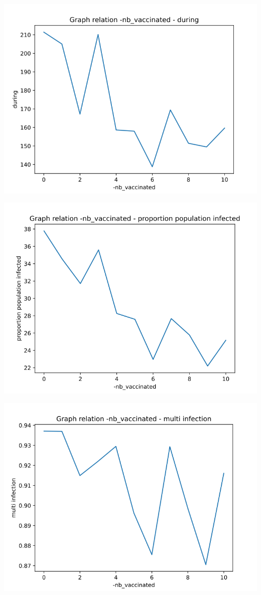 \documentclass[a4paper, 11pt]{article}
\begin{document}
				
				\includegraphics[scale=0.45]{attachements/nb_vaccinated_during.png}
				
				\includegraphics[scale=0.45]{attachements/nb_vaccinated_proportion.png}
				
				\includegraphics[scale=0.45]{attachements/nb_vaccinated_multi_infection.png}
				
\end{document}
